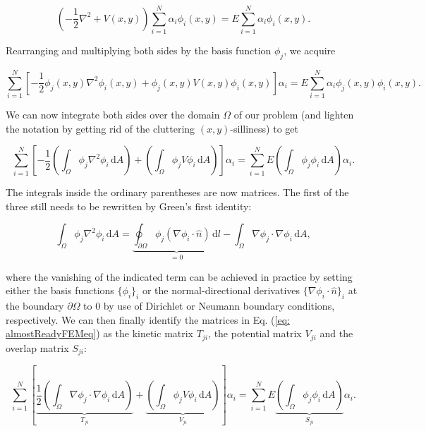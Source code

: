 \documentclass[a4paper,12pt]{article}
\newcommand{\dd}{\,\mathrm{d}}
\begin{document}
\begin{equation}
\label{eq: schrodingerInFEMBasis}
\left( -\frac{1}{2} \nabla^2 + V(x,y) \right) \sum_{i=1}^{N} \alpha_i \phi_i(x,y)  = E \sum_{i=1}^{N} \alpha_i \phi_i(x,y).
\end{equation}

Rearranging and multiplying both sides by the basis function $\phi_j$, we acquire

\begin{equation}
\sum_{i=1}^{N} \left[ -\frac{1}{2} \phi_j(x,y) \nabla^2 \phi_i(x,y) + \phi_j(x,y) V(x,y) \phi_i(x,y) \right]  \alpha_i   = E \sum_{i=1}^{N} \alpha_i \phi_j(x,y) \phi_i(x,y).
\end{equation}

We can now integrate both sides over the domain $\Omega$ of our problem (and lighten the notation by getting rid of the cluttering $(x, y)$-silliness) to get

\begin{equation}
\label{eq: almostReadyFEMeq}
\sum_{i=1}^{N} \left[ -\frac{1}{2} \left( \int_{\Omega} \phi_j \nabla^2 \phi_i \dd A \right) + \left( \int_{\Omega} \phi_j V \phi_i \dd A \right) \right]  \alpha_i   = \sum_{i=1}^{N} E \left( \int_{\Omega} \phi_j \phi_i \dd A \right) \alpha_i .
\end{equation}

The integrals inside the ordinary parentheses are now matrices. The first of the three still needs to be rewritten by Green's first identity:

\begin{equation}
\int_{\Omega} \phi_j \nabla^2 \phi_i \dd A = \underbrace{\oint_{\partial\Omega} \phi_j (\nabla \phi_i \cdot \hat{n} )\dd l}_{=0} - \int_{\Omega} \nabla \phi_j \cdot \nabla \phi_i \dd A,
\end{equation}

where the vanishing of the indicated term can be achieved in practice by setting either the basis functions $\lbrace\phi_i\rbrace_i$ or the normal-directional derivatives $\lbrace \nabla \phi_i \cdot \hat{n}\rbrace_i$ at the boundary $\partial \Omega$ to 0 by use of Dirichlet or Neumann boundary conditions, respectively. We can then finally identify the matrices in Eq. (\ref{eq: almostReadyFEMeq}) as the kinetic matrix $T_{ji}$, the potential matrix $V_{ji}$ and the overlap matrix $S_{ji}$:

\begin{equation}
\label{eq: readyFEMeq}
\sum_{i=1}^{N} \left[ \underbrace{\frac{1}{2} \left( \int_{\Omega} \nabla \phi_j \cdot \nabla \phi_i \dd A \right)}_{T_{ji}} + \underbrace{\left( \int_{\Omega} \phi_j V \phi_i \dd A \right)}_{V_{ji}} \right]  \alpha_i   = \sum_{i=1}^{N} E \underbrace{\left( \int_{\Omega} \phi_j \phi_i \dd A \right)}_{S_{ji}} \alpha_i .
\end{equation}
\end{document}
